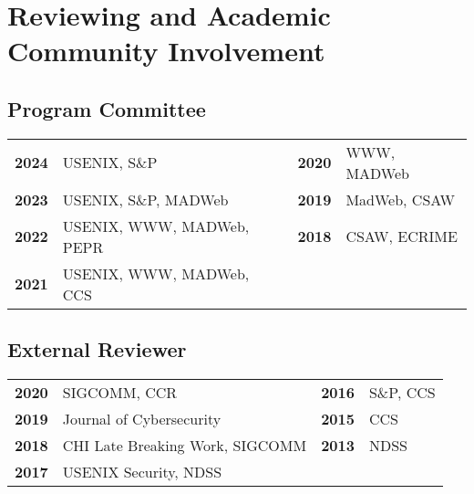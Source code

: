 \documentclass[wideaddress]{vitae}
\begin{document}
  
    \nocite{chouaki2023search}
    \nocite{mcquistin2023psl}
    \nocite{snyder2023poolparty}
    \nocite{randall2022uid}
    \nocite{davidson2022star}
    \nocite{smith2022blocked}
    \nocite{jueckstock2022stateful}
    \nocite{smith2021sugarcoat}
    \nocite{jueckstock2021measurements}
    \nocite{chen2021javascriptsigs}
    \nocite{snyder2020filters}
    \nocite{sjosten2020generation}
    \nocite{papadopoulos2020paywalls}
    \nocite{iqbal2020adgraph}
    \nocite{ghasemisharif2019speedreader}
    \nocite{snyder2017browser}
    \nocite{snyder2017doxing}
    \nocite{snyder2017cdf}
    \nocite{snyder2016browser}
    \nocite{snyder2016characterizing}
    \nocite{snyder2016phishing}
    \nocite{snyder2015no}
    \nocite{clark2015saw}
    \nocite{snyder2014yao}
    \nocite{snyder2014cloudsweeper}
    \nocite{snyder2013cloudsweeper}
  

  \section{Reviewing and Academic Community Involvement}
  \subsection{Program Committee}
  \begin{tabular}{llll}
    \textbf{2024} & USENIX, S\&P &           \textbf{2020} & WWW, MADWeb \\
    \textbf{2023} & USENIX, S\&P, MADWeb &   \textbf{2019} & MadWeb, CSAW \\
    \textbf{2022} & USENIX, WWW, MADWeb, PEPR & \textbf{2018} & CSAW, ECRIME \\
    \textbf{2021} & USENIX, WWW, MADWeb, CCS \\
  \end{tabular}

  \subsection{External Reviewer}
  \begin{tabular}{llll}
    \textbf{2020} & SIGCOMM, CCR &                    \textbf{2016} & S\&P, CCS \\
    \textbf{2019} & Journal of Cybersecurity &        \textbf{2015} & CCS \\
    \textbf{2018} & CHI Late Breaking Work, SIGCOMM & \textbf{2013} & NDSS \\
    \textbf{2017} & USENIX Security, NDSS \\
  \end{tabular}
\end{document}
